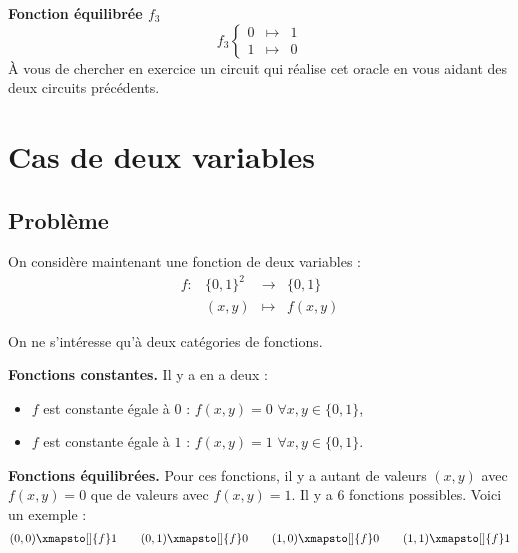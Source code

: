 \documentclass[11pt,class=report,crop=false]{standalone}
\begin{document}
\bigskip

\textbf{Fonction équilibrée $f_3$}
$$f_3 \left\{\begin{array}{rcl}0&\mapsto&1\\1&\mapsto&0\end{array}\right.$$
À vous de chercher en exercice un circuit qui réalise cet oracle en vous aidant des deux circuits précédents.



\section{Cas de deux variables}


%
%
%

\subsection{Problème}

On considère maintenant une fonction de deux variables :
$$\begin{array}{cccc}
f : & \{0,1\}^2  & \longrightarrow & \{0,1\} \\
    & (x,y)      & \longmapsto     & f(x,y) 
\end{array}$$


On ne s'intéresse qu'à deux catégories de fonctions.


\textbf{Fonctions constantes.}
Il y a en a deux :
\begin{itemize}
  \item $f$ est constante égale à $0$ : $f(x,y)=0$ $\forall x,y \in \{0,1\}$,
  \item $f$ est constante égale à $1$ : $f(x,y)=1$ $\forall x,y \in \{0,1\}$.
\end{itemize}

\textbf{Fonctions équilibrées.}
Pour ces fonctions, il y a autant de valeurs $(x,y)$ avec $f(x,y)=0$ que de valeurs avec $f(x,y)=1$.
Il y a $6$ fonctions possibles. Voici un exemple :
$$(0,0) \xmapsto[]{f} 1 \qquad
(0,1) \xmapsto[]{f} 0 \qquad
(1,0) \xmapsto[]{f} 0 \qquad
(1,1) \xmapsto[]{f} 1$$
\end{document}
